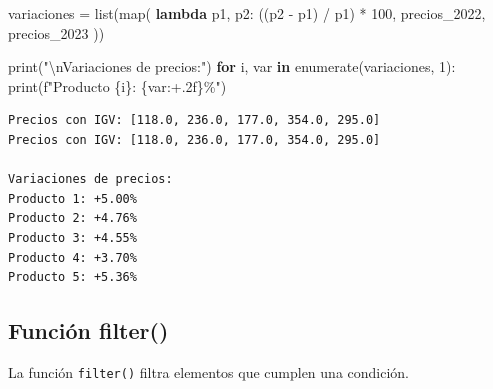 \documentclass[
  doc,
  floatsintext,
  longtable,
  a4paper,
  nolmodern,
  notxfonts,
  notimes,
  12pt,
  colorlinks=true,linkcolor=blue,citecolor=blue,urlcolor=blue]{apa7}
\newenvironment{Shaded}{\begin{snugshade}}{\end{snugshade}}
\newcommand{\BuiltInTok}[1]{\textcolor[rgb]{0.00,0.23,0.31}{#1}}
\newcommand{\CharTok}[1]{\textcolor[rgb]{0.13,0.47,0.30}{#1}}
\newcommand{\ControlFlowTok}[1]{\textcolor[rgb]{0.00,0.23,0.31}{\textbf{#1}}}
\newcommand{\DecValTok}[1]{\textcolor[rgb]{0.68,0.00,0.00}{#1}}
\newcommand{\KeywordTok}[1]{\textcolor[rgb]{0.00,0.23,0.31}{\textbf{#1}}}
\newcommand{\NormalTok}[1]{\textcolor[rgb]{0.00,0.23,0.31}{#1}}
\newcommand{\OperatorTok}[1]{\textcolor[rgb]{0.37,0.37,0.37}{#1}}
\newcommand{\SpecialCharTok}[1]{\textcolor[rgb]{0.37,0.37,0.37}{#1}}
\newcommand{\SpecialStringTok}[1]{\textcolor[rgb]{0.13,0.47,0.30}{#1}}
\newcommand{\StringTok}[1]{\textcolor[rgb]{0.13,0.47,0.30}{#1}}
\begin{document}
\begin{Shaded}
\begin{Highlighting}[]
\NormalTok{variaciones }\OperatorTok{=} \BuiltInTok{list}\NormalTok{(}\BuiltInTok{map}\NormalTok{(}
    \KeywordTok{lambda}\NormalTok{ p1, p2: ((p2 }\OperatorTok{{-}}\NormalTok{ p1) }\OperatorTok{/}\NormalTok{ p1) }\OperatorTok{*} \DecValTok{100}\NormalTok{,}
\NormalTok{    precios\_2022,}
\NormalTok{    precios\_2023}
\NormalTok{))}

\BuiltInTok{print}\NormalTok{(}\StringTok{"}\CharTok{\textbackslash{}n}\StringTok{Variaciones de precios:"}\NormalTok{)}
\ControlFlowTok{for}\NormalTok{ i, var }\KeywordTok{in} \BuiltInTok{enumerate}\NormalTok{(variaciones, }\DecValTok{1}\NormalTok{):}
    \BuiltInTok{print}\NormalTok{(}\SpecialStringTok{f"Producto }\SpecialCharTok{\{}\NormalTok{i}\SpecialCharTok{\}}\SpecialStringTok{: }\SpecialCharTok{\{}\NormalTok{var}\SpecialCharTok{:+.2f\}}\SpecialStringTok{\%"}\NormalTok{)}
\end{Highlighting}
\end{Shaded}

\begin{verbatim}
Precios con IGV: [118.0, 236.0, 177.0, 354.0, 295.0]
Precios con IGV: [118.0, 236.0, 177.0, 354.0, 295.0]

Variaciones de precios:
Producto 1: +5.00%
Producto 2: +4.76%
Producto 3: +4.55%
Producto 4: +3.70%
Producto 5: +5.36%
\end{verbatim}

\subsection{Función filter()}\label{funciuxf3n-filter}

La función \texttt{filter()} filtra elementos que cumplen una condición.
\end{document}
